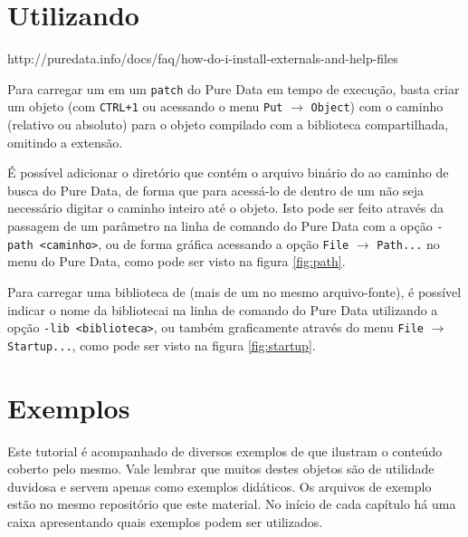 \section{Utilizando \externals}
\label{sec:using}

http://puredata.info/docs/faq/how-do-i-install-externals-and-help-files

Para carregar um \external em um \texttt{patch} do Pure Data em tempo de
execução, basta criar um objeto (com \texttt{CTRL+1} ou acessando o menu
\texttt{Put} $\rightarrow$ \texttt{Object}) com o caminho (relativo ou
absoluto) para o objeto compilado com a biblioteca compartilhada, omitindo a
extensão.

É possível adicionar o diretório que contém o arquivo binário do \external ao
caminho de busca do Pure Data, de forma que para acessá-lo de dentro de um
\patch não seja necessário digitar o caminho inteiro até o objeto. Isto pode
ser feito através da passagem de um parâmetro na linha de comando do Pure Data
com a opção \texttt{-path <caminho>}, ou de forma gráfica acessando a opção
\texttt{File} $\rightarrow$ \texttt{Path...} no menu do Pure Data,
como pode ser visto na figura \ref{fig:path}.


Para carregar uma biblioteca de \externals (mais de um \external no mesmo
arquivo-fonte), é possível indicar o nome da bibliotecai na linha
de comando do Pure Data utilizando a opção \texttt{-lib <biblioteca>}, ou
também graficamente através do menu \texttt{File} $\rightarrow$
\texttt{Startup...}, como pode ser visto na figura \ref{fig:startup}.


\section{Exemplos}
Este tutorial é acompanhado de diversos exemplos de \externals que ilustram o
conteúdo coberto pelo mesmo.
Vale lembrar que muitos destes objetos são de utilidade duvidosa e servem apenas
como exemplos didáticos.
Os arquivos de exemplo estão no mesmo repositório que este material.
No início de cada capítulo há uma caixa apresentando quais exemplos podem ser
utilizados.
